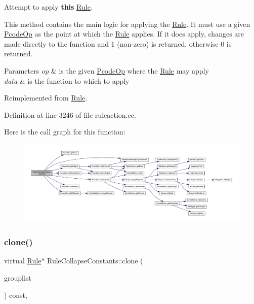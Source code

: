 Attempt to apply {\bfseries{this}} \mbox{\hyperlink{class_rule}{Rule}}. 

This method contains the main logic for applying the \mbox{\hyperlink{class_rule}{Rule}}. It must use a given \mbox{\hyperlink{class_pcode_op}{Pcode\+Op}} as the point at which the \mbox{\hyperlink{class_rule}{Rule}} applies. If it does apply, changes are made directly to the function and 1 (non-\/zero) is returned, otherwise 0 is returned. 
\begin{DoxyParams}{Parameters}
{\em op} & is the given \mbox{\hyperlink{class_pcode_op}{Pcode\+Op}} where the \mbox{\hyperlink{class_rule}{Rule}} may apply \\
\hline
{\em data} & is the function to which to apply \\
\hline
\end{DoxyParams}


Reimplemented from \mbox{\hyperlink{class_rule_a4e3e61f066670175009f60fb9dc60848}{Rule}}.



Definition at line 3246 of file ruleaction.\+cc.

Here is the call graph for this function\+:
\nopagebreak
\begin{figure}[H]
\begin{center}
\leavevmode
\includegraphics[width=350pt]{class_rule_collapse_constants_a9dbb37c234aa8599bed3e916bdc15147_cgraph}
\end{center}
\end{figure}
\mbox{\label{class_rule_collapse_constants_a72200e198cae9d858f56dab54bd476de}} 
\subsubsection{\texorpdfstring{clone()}{clone()}}
{\footnotesize\ttfamily virtual \mbox{\hyperlink{class_rule}{Rule}}$\ast$ Rule\+Collapse\+Constants\+::clone (\begin{DoxyParamCaption}\item[{const \mbox{\hyperlink{class_action_group_list}{Action\+Group\+List}} \&}]{grouplist }\end{DoxyParamCaption}) const\hspace{0.3cm}{\ttfamily [inline]}, {\ttfamily [virtual]}}



